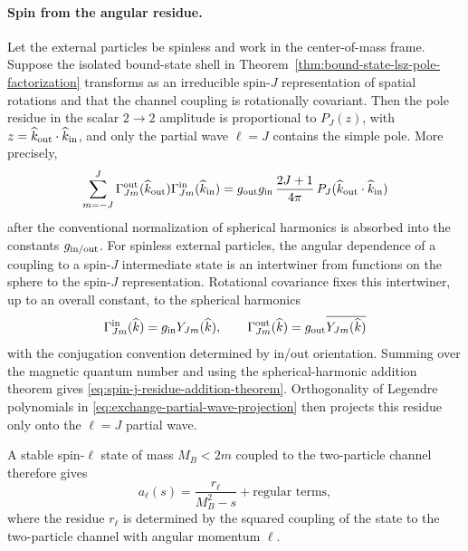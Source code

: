 \paragraph{Spin from the angular residue.}
Let the external particles be spinless and work in the center-of-mass frame.
Suppose the isolated bound-state shell in
Theorem~\ref{thm:bound-state-lsz-pole-factorization} transforms as an
irreducible spin-\(J\) representation of spatial rotations and that the
channel coupling is rotationally covariant.  Then the pole residue in the
scalar \(2\to2\) amplitude is proportional to \(P_J(z)\), with
\(z=\widehat k_{\rm out}\cdot\widehat k_{\rm in}\), and only the partial wave
\(\ell=J\) contains the simple pole.  More precisely,
\begin{equation}
  \sum_{m=-J}^{J}
  \Gamma^{\rm out}_{Jm}(\widehat k_{\rm out})
  \Gamma^{\rm in}_{Jm}(\widehat k_{\rm in})
  =
  g_{\rm out}g_{\rm in}\,
  \frac{2J+1}{4\pi}\,
  P_J(\widehat k_{\rm out}\cdot\widehat k_{\rm in})
  \label{eq:spin-j-residue-addition-theorem}
\end{equation}
after the conventional normalization of spherical harmonics is absorbed into
the constants \(g_{\rm in/out}\).
For spinless external particles, the angular dependence of a coupling to a
spin-\(J\) intermediate state is an intertwiner from functions on the sphere
to the spin-\(J\) representation.  Rotational covariance fixes this
intertwiner, up to an overall constant, to the spherical harmonics
\[
  \Gamma^{\rm in}_{Jm}(\widehat k)=g_{\rm in}Y_{Jm}(\widehat k),
  \qquad
  \Gamma^{\rm out}_{Jm}(\widehat k)=g_{\rm out}
  \overline{Y_{Jm}(\widehat k)}
  \]
with the conjugation convention determined by in/out orientation.  Summing
over the magnetic quantum number and using the spherical-harmonic addition
theorem gives \eqref{eq:spin-j-residue-addition-theorem}.  Orthogonality of
Legendre polynomials in
\eqref{eq:exchange-partial-wave-projection} then projects this residue only
onto the \(\ell=J\) partial wave.

A stable spin-\(\ell\) state of mass \(M_B<2m\) coupled to the two-particle
channel therefore gives
\[
  a_\ell(s)
  =
  \frac{r_\ell}{M_B^2-s}
  +\text{regular terms},
\]
where the residue \(r_\ell\) is determined by the squared coupling of the
state to the two-particle channel with angular momentum \(\ell\).

\begin{center}
\end{center}

